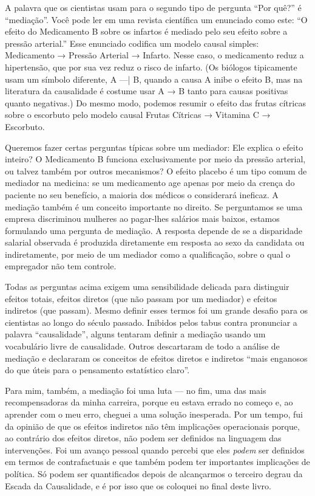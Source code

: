 \documentclass[11pt,a5paper,twoside]{book}
\begin{document}
A palavra que os cientistas usam para o segundo tipo de pergunta “Por quê?” é “mediação”. Você pode ler em uma revista científica um enunciado como este: “O efeito do Medicamento B sobre os infartos é mediado pelo seu efeito sobre a pressão arterial.” Esse enunciado codifica um modelo causal simples: Medicamento → Pressão Arterial → Infarto. Nesse caso, o medicamento reduz a hipertensão, que por sua vez reduz o risco de infarto. (Os biólogos tipicamente usam um símbolo diferente, A —| B, quando a causa A inibe o efeito B, mas na literatura da causalidade é costume usar A → B tanto para causas positivas quanto negativas.) Do mesmo modo, podemos resumir o efeito das frutas cítricas sobre o escorbuto pelo modelo causal Frutas Cítricas → Vitamina C → Escorbuto.

Queremos fazer certas perguntas típicas sobre um mediador: Ele explica o efeito inteiro? O Medicamento B funciona exclusivamente por meio da pressão arterial, ou talvez também por outros mecanismos? O efeito placebo é um tipo comum de mediador na medicina: se um medicamento age apenas por meio da crença do paciente no seu benefício, a maioria dos médicos o considerará ineficaz. A mediação também é um conceito importante no direito. Se perguntamos se uma empresa discriminou mulheres ao pagar-lhes salários mais baixos, estamos formulando uma pergunta de mediação. A resposta depende de se a disparidade salarial observada é produzida diretamente em resposta ao sexo da candidata ou indiretamente, por meio de um mediador como a qualificação, sobre o qual o empregador não tem controle.

Todas as perguntas acima exigem uma sensibilidade delicada para distinguir efeitos totais, efeitos diretos (que não passam por um mediador) e efeitos indiretos (que passam). Mesmo definir esses termos foi um grande desafio para os cientistas ao longo do século passado. Inibidos pelos tabus contra pronunciar a palavra “causalidade”, alguns tentaram definir a mediação usando um vocabulário livre de causalidade. Outros descartaram de todo a análise de mediação e declararam os conceitos de efeitos diretos e indiretos “mais enganosos do que úteis para o pensamento estatístico claro”.

Para mim, também, a mediação foi uma luta — no fim, uma das mais recompensadoras da minha carreira, porque eu estava errado no começo e, ao aprender com o meu erro, cheguei a uma solução inesperada. Por um tempo, fui da opinião de que os efeitos indiretos não têm implicações operacionais porque, ao contrário dos efeitos diretos, não podem ser definidos na linguagem das intervenções. Foi um avanço pessoal quando percebi que eles \textit{podem} ser definidos em termos de contrafactuais e que também podem ter importantes implicações de política. Só podem ser quantificados depois de alcançarmos o terceiro degrau da Escada da Causalidade, e é por isso que os coloquei no final deste livro.
\end{document}
